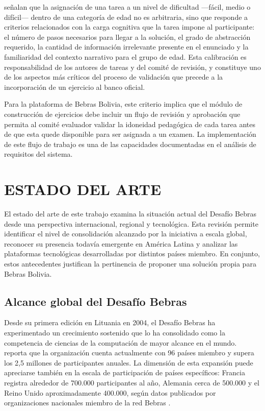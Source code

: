 \textcite{dagienestupuriene2016} señalan que la asignación de una tarea a un nivel de dificultad —fácil, medio o difícil— dentro de una categoría de edad no es arbitraria, sino que responde a criterios relacionados con la carga cognitiva que la tarea impone al participante: el número de pasos necesarios para llegar a la solución, el grado de abstracción requerido, la cantidad de información irrelevante presente en el enunciado y la familiaridad del contexto narrativo para el grupo de edad. Esta calibración es responsabilidad de los autores de tareas y del comité de revisión, y constituye uno de los aspectos más críticos del proceso de validación que precede a la incorporación de un ejercicio al banco oficial.

Para la plataforma de Bebras Bolivia, este criterio implica que el módulo de construcción de ejercicios debe incluir un flujo de revisión y aprobación que permita al comité evaluador validar la idoneidad pedagógica de cada tarea antes de que esta quede disponible para ser asignada a un examen. La implementación de este flujo de trabajo es una de las capacidades documentadas en el análisis de requisitos del sistema.

\section{ESTADO DEL ARTE}

El estado del arte de este trabajo examina la situación actual del Desafío Bebras desde una perspectiva internacional, regional y tecnológica. Esta revisión permite identificar el nivel de consolidación alcanzado por la iniciativa a escala global, reconocer su presencia todavía emergente en América Latina y analizar las plataformas tecnológicas desarrolladas por distintos países miembro. En conjunto, estos antecedentes justifican la pertinencia de proponer una solución propia para Bebras Bolivia.

\subsection{Alcance global del Desafío Bebras}

Desde su primera edición en Lituania en 2004, el Desafío Bebras ha experimentado un crecimiento sostenido que lo ha consolidado como la competencia de ciencias de la computación de mayor alcance en el mundo. \textcite{bebras} reporta que la organización cuenta actualmente con 96 países miembro y supera los 2,5 millones de participantes anuales. La dimensión de esta expansión puede apreciarse también en la escala de participación de países específicos: Francia registra alrededor de 700.000 participantes al año, Alemania cerca de 500.000 y el Reino Unido aproximadamente 400.000, según datos publicados por organizaciones nacionales miembro de la red Bebras \parencite{bebraseeuu}.

